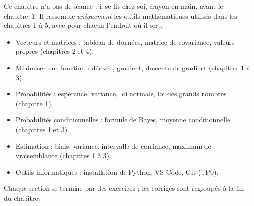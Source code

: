 \documentclass[11pt]{article}
\begin{document}
\pagedetitre

\begin{objectifs}
Ce chapitre n'a pas de séance : il se lit chez soi, crayon en main, avant le chapitre~1.
Il rassemble \emph{uniquement} les outils mathématiques utilisés dans les chapitres 1 à 5, avec pour chacun l'endroit où il sert.
\begin{itemize}
  \item Vecteurs et matrices : tableau de données, matrice de covariance, valeurs propres (chapitres 2 et 4).
  \item Minimiser une fonction : dérivée, gradient, descente de gradient (chapitres 1 à 3).
  \item Probabilités : espérance, variance, loi normale, loi des grands nombres (chapitre 1).
  \item Probabilités conditionnelles : formule de Bayes, moyenne conditionnelle (chapitres 1 et 3).
  \item Estimation : biais, variance, intervalle de confiance, maximum de vraisemblance (chapitres 1 à 3).
  \item Outils informatiques : installation de Python, VS Code, Git (TP0).
\end{itemize}
Chaque section se termine par des exercices ; les corrigés sont regroupés à la fin du chapitre.
\end{objectifs}

\tableofcontents
\newpage










\end{document}
